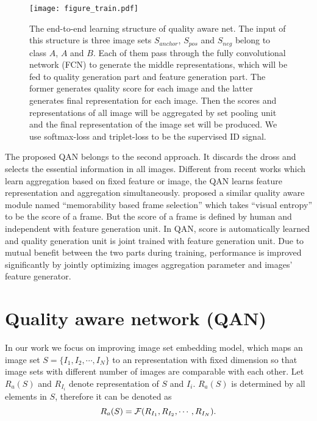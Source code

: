 \documentclass[10pt,twocolumn,letterpaper]{article}
\begin{document}
\label{sec:qualitynet}
\begin{figure*}[!htbp]
  \centering
  \texttt{[image: figure\_train.pdf]}
  \caption{The end-to-end learning structure of quality aware net. The input of this structure is three image sets $S_{anchor}$, $S_{pos}$ and $S_{neg}$ belong to class $A$, $A$ and $B$. Each of them pass through the fully convolutional network (FCN) to generate the middle representations, which will be fed to quality generation part and feature generation part. The former generates quality score for each image and the latter generates final representation for each image. Then the scores and representations of all image will be aggregated by set pooling unit and the final representation of the image set will be produced. We use softmax-loss and triplet-loss to be the supervised ID signal. }
\label{figure_train}
\end{figure*}


The proposed QAN belongs to the second approach. It 
discards the dross and selects the essential information in all images. Different from recent works which learn aggregation based on fixed feature \cite{yang2016neural} or image\cite{hassner2016pooling}, the QAN learns feature representation and aggregation simultaneously.  \cite{goswami2014mdlface} proposed a similar quality aware module named ``memorability based frame selection'' which  takes ``visual entropy'' to be the score of a frame. But the score of a frame is defined by human and independent with feature generation unit. In QAN,  score is automatically learned and quality generation unit is joint trained with feature generation unit. Due to mutual benefit between the two parts during training, performance is improved significantly by jointly optimizing images aggregation parameter and images' feature generator.


 \section{Quality aware network (QAN)}

In our work we focus on improving image set embedding model, which maps an image set $S=\{I_1, I_2, \cdots, I_N\}$ to an representation with fixed dimension so that image sets with different number of images are comparable with each other. Let $R_a(S)$ and $R_{I_i}$ denote representation of $S$ and $I_i$. $R_a(S)$ is determined by all elements in $S$, therefore it can be denoted as
\begin{equation}
\small
\label{3}
R_a(S) = \mathcal{F}(R_{I_1}, R_{I_2}, \cdots, R_{I_N}).
\end{equation}
\end{document}
